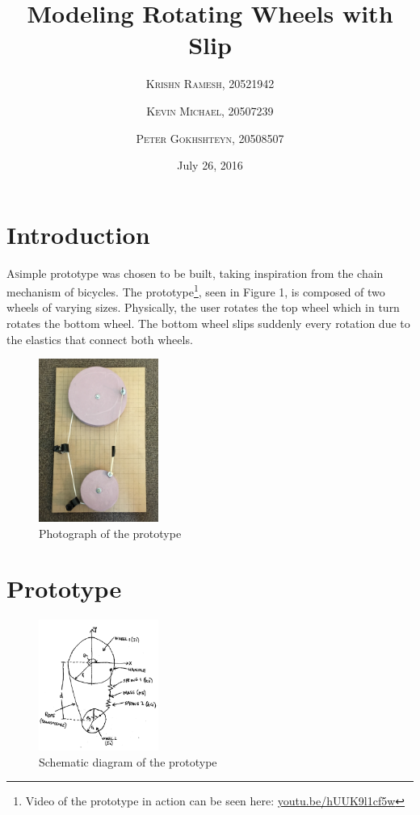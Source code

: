 \documentclass[twoside,twocolumn]{article}
\title{Modeling Rotating Wheels with Slip} %
\author{%
\textsc{Krishn Ramesh, 20521942} \\[1ex]
\and
\textsc{Kevin Michael, 20507239} \\[1ex]
\and
\textsc{Peter Gokhshteyn, 20508507} \\[1ex]
}
\date{July 26, 2016} %
\begin{document}
\maketitle


\section{Introduction}

\lettrine[nindent=0em,lines=3]{A} simple prototype was chosen to be built, taking inspiration from the chain mechanism of bicycles. The prototype\footnote{Video of the prototype in action can be seen here: \href{url}{youtu.be/hUUK9l1cf5w}}, seen in Figure 1, is composed of two wheels of varying sizes. Physically, the user rotates the top wheel which in turn rotates the bottom wheel. The bottom wheel slips suddenly every rotation due to the elastics that connect both wheels.

\begin{figure}[!t]
    \caption{Photograph of the prototype}
    \centering
        \includegraphics[width=0.35\textwidth]{prototype.jpg}
\end{figure}


\section{Prototype}

\begin{figure}[!t]
    \caption{Schematic diagram of the prototype}
    \centering
        \includegraphics[width=0.35\textwidth]{schematic.png}
\end{figure}
\end{document}
